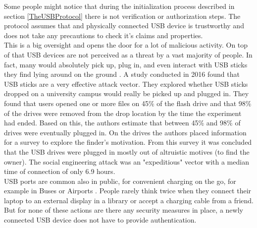 Some people might notice that during the initialization process described in section \ref{TheUSBProtocol} there is not verification or authorization steps. The protocol assumes that and physically connected USB device is trustworthy and does not take any precautions to check it's claims and properties. \\
This is a big oversight and opens the door for a lot of malicious activity. 
On top of that USB devices are not perceived as a threat by a vast majority of people. In fact, many would absolutely pick up, plug in, and even interact with USB sticks they find lying around on the ground \cite{tischerUsersReallyPlug2016}. A study \cite{tischerUsersReallyPlug2016} conducted in 2016 found that USB sticks are a very effective attack vector. They explored whether USB sticks dropped on a university campus would really be picked up and plugged in. They found that users opened one or more files on 45\% of the flash drive and that 98\% of the drives were removed from the drop location by the time the experiment had ended. Based on this, the authors estimate that between 45\% and 98\% of drives were eventually plugged in. On the drives the authors placed information for a survey to explore the finder's motivation. From this survey it was concluded that the USB drives were plugged in mostly out of altruistic motives (to find the owner). The social engineering attack was an "expeditious" vector with a median time of connection of only 6.9 hours.  \\
USB ports are common also in public, for convenient charging on the go, for example in Buses or Airports \cite{kumarJuiceJackingUSB2020}. People rarely think twice when they connect their laptop to an external display in a library or accept a charging cable from a friend. But for none of these actions are there any security measures in place, a newly connected USB device does not have to provide authentication.

